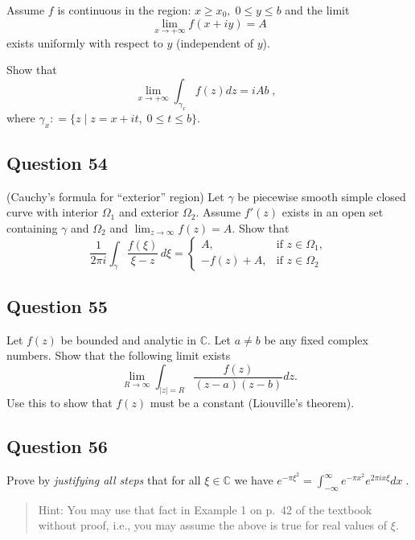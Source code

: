 \documentclass[12pt]{article}
\begin{document}
Assume \(f\) is continuous in the region:
\(x \geq x_0, \; 0 \leq y \leq b\) and the limit
\[\displaystyle \lim_{x \rightarrow + \infty} f(x + iy) = A\] exists
uniformly with respect to \(y\) (independent of \(y\)).

Show that
\[\lim_{x \rightarrow + \infty} \int_{\gamma_x} f(z) dz  = iA b \; , \; \;\]
where \(\gamma_x : = \{ z \; | \; z = x + it, \; 0 \leq t \leq b\}.\)

\hypertarget{question-54-2}{%
\subsection{Question 54}\label{question-54-2}}

(Cauchy's formula for ``exterior'' region) Let \(\gamma\) be piecewise
smooth simple closed curve with interior \(\Omega_1\) and exterior
\(\Omega_2\). Assume \(f'(z)\) exists in an open set containing
\(\gamma\) and \(\Omega_2\) and
\(\lim_{z \rightarrow \infty } f(z) = A\). Show that
\[\frac{1}{2 \pi i} \int_\gamma \frac{f(\xi)}{\xi - z} \, d \xi =
\begin{cases}
A,          &     \text{if\ $z \in \Omega_1$}, \\
-f (z) + A, &  \text{if\ $z \in \Omega_2$}
\end{cases}\]

\hypertarget{question-55-2}{%
\subsection{Question 55}\label{question-55-2}}

Let \(f(z)\) be bounded and analytic in \(\mathbb C\). Let \(a \neq b\)
be any fixed complex numbers. Show that the following limit exists
\[\lim_{R \rightarrow \infty} \int_{|z|=R} \frac{f(z)}{(z-a)(z-b)} dz.\]
Use this to show that \(f(z)\) must be a constant (Liouville's theorem).

\hypertarget{question-56-2}{%
\subsection{Question 56}\label{question-56-2}}

Prove by \emph{justifying all steps} that for all
\(\xi \in {\mathbb C}\) we have
\(\displaystyle e^{- \pi \xi^2} = \int_{- \infty}^\infty e^{- \pi x^2} e^{2 \pi i x \xi} dx \; .\)

\begin{quote}
Hint: You may use that fact in Example 1 on p.~42 of the textbook
without proof, i.e., you may assume the above is true for real values of
\(\xi\).
\end{quote}
\end{document}
